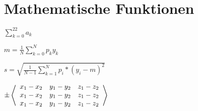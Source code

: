 \section{Mathematische Funktionen}

$\sum\limits_{k=0}^{22} a_k$

$m = \frac{1}{N} \sum\limits_{k=0}^{N}p_k y_k$

$s= \sqrt{\frac{1}{N-1} \sum\limits_{k=1}^{N}p_i*(y_i-m)^2}$


$ \pm \left\langle 
\begin{array}{c c c}
	x_1-x_2 & y_1 -y_2 & z_1 - z_2 \\
	x_1-x_2 & y_1 -y_2 & z_1 - z_2 \\
	x_1-x_2 & y_1 -y_2 & z_1 - z_2
\end{array}
\right\rangle$